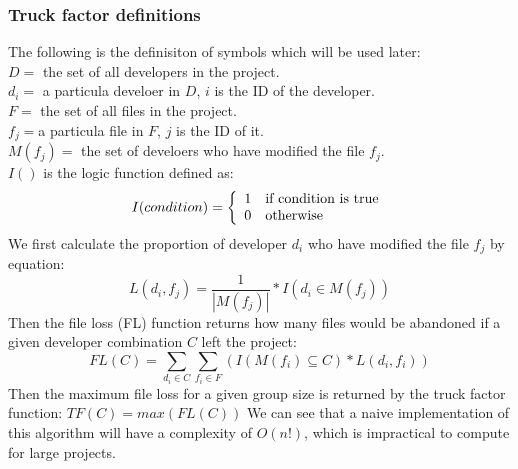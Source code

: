 \subsubsection{Truck factor definitions}
The following is the definisiton of symbols which will be used later:\\
$D =$ the set of all developers in the project.\\ %
$d_{i}=$ a particula develoer in $D$, $i$ is the ID of the developer.\\
$F=$ the set of all files in the project.\\ %
$f_{j}=$a particula file in $F$, $j$ is the ID of it.\\
$M(f_{j})=$ the set of develoers who have modified the file $f_{j}$.\\
$I()$ is the logic function defined as:
\[ I(condition) = \left\{
\begin{array}{l l}
1 & \textmd{if condition is true}\\
0 & \textmd{otherwise}
\end{array} \right.\]
We first calculate the proportion of developer $d_{i}$ who have modified the file $f_{j}$ by equation:
\begin{equation}L(d_{i},f_{j})=\frac{1}{|M(f_{j})|} * I(d_{i} \in M(f_{j} )) \end{equation}
Then the file loss (FL) function returns how many files would be abandoned if a given developer combination $C$ left the project:
\begin{equation}
FL(C) = \sum_{d_i \in C} \sum_{f_i \in F} (I(M(f_i) \subseteq C)* L(d_i,f_i))
\end{equation}
Then the maximum file loss for a given group size is returned by the truck factor function:
$TF(C) = max(FL(C))$
We can see that a naive implementation of this algorithm will have a complexity of $O(n!)$, which is impractical to compute for large projects.

